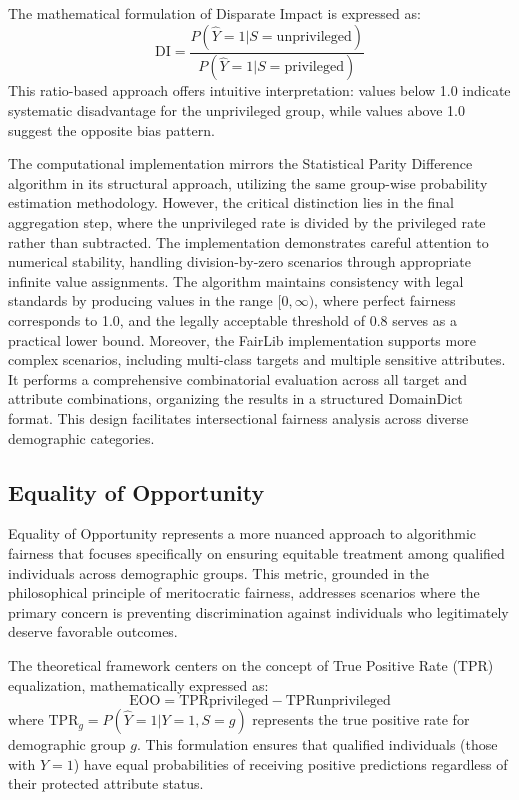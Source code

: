 \documentclass[12pt,a4paper,openright,twoside]{book}
\begin{document}
The mathematical formulation of Disparate Impact is expressed as:
\begin{equation}
\text{DI} = \frac{P(\hat{Y}=1|S=\text{unprivileged})}{P(\hat{Y}=1|S=\text{privileged})}
\end{equation}
This ratio-based approach offers intuitive interpretation: values below 1.0 indicate systematic disadvantage for the unprivileged group, while values above 1.0 suggest the opposite bias pattern.

The computational implementation mirrors the Statistical Parity Difference algorithm in its structural approach, utilizing the same group-wise probability estimation methodology. However, the critical distinction lies in the final aggregation step, where the unprivileged rate is divided by the privileged rate rather than subtracted. The implementation demonstrates careful attention to numerical stability, handling division-by-zero scenarios through appropriate infinite value assignments. The algorithm maintains consistency with legal standards by producing values in the range $[0, \infty)$, where perfect fairness corresponds to 1.0, and the legally acceptable threshold of 0.8 serves as a practical lower bound. Moreover, the FairLib implementation supports more complex scenarios, including multi-class targets and multiple sensitive attributes. It performs a comprehensive combinatorial evaluation across all target and attribute combinations, organizing the results in a structured DomainDict format. This design facilitates intersectional fairness analysis across diverse demographic categories.

\subsection{Equality of Opportunity}

Equality of Opportunity represents a more nuanced approach to algorithmic fairness that focuses specifically on ensuring equitable treatment among qualified individuals across demographic groups. This metric, grounded in the philosophical principle of meritocratic fairness, addresses scenarios where the primary concern is preventing discrimination against individuals who legitimately deserve favorable outcomes.

The theoretical framework centers on the concept of True Positive Rate (TPR) equalization, mathematically expressed as:
\begin{equation}
\text{EOO} = \text{TPR} {\text{privileged}} - \text{TPR} {\text{unprivileged}}
\end{equation}
where $\text{TPR}_{g} = P(\hat{Y}=1|Y=1, S=g)$ represents the true positive rate for demographic group $g$. This formulation ensures that qualified individuals (those with $Y=1$) have equal probabilities of receiving positive predictions regardless of their protected attribute status.
\end{document}

